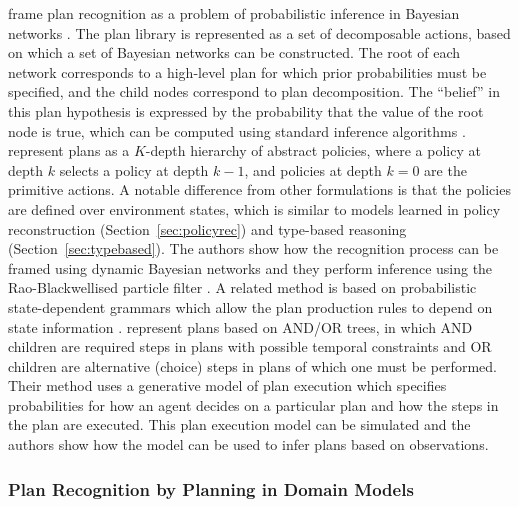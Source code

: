 \documentclass[final,1p,times,authoryear]{elsarticle}
\begin{document}
\citet{cg1993} frame plan recognition as a problem of probabilistic inference in Bayesian networks \citep{p1988}. The plan library is represented as a set of decomposable actions, based on which a set of Bayesian networks can be constructed. The root of each network corresponds to a high-level plan for which prior probabilities must be specified, and the child nodes correspond to plan decomposition. The ``belief'' in this plan hypothesis is expressed by the probability that the value of the root node is true, which can be computed using standard inference algorithms \citep{p1988}. \citet{bvw2002} represent plans as a $K$-depth hierarchy of abstract policies, where a policy at depth $k$ selects a policy at depth $k-1$, and policies at depth $k=0$ are the primitive actions. A notable difference from other formulations is that the policies are defined over environment states, which is similar to models learned in policy reconstruction (Section~\ref{sec:policyrec}) and type-based reasoning (Section~\ref{sec:typebased}). The authors show how the recognition process can be framed using dynamic Bayesian networks and they perform inference using the Rao-Blackwellised particle filter \citep{dfmr2000}. A related method is based on probabilistic state-dependent grammars which allow the plan production rules to depend on state information \citep{pw2000}. \citet{gg2009} represent plans based on AND/OR trees, in which AND children are required steps in plans with possible temporal constraints and OR children are alternative (choice) steps in plans of which one must be performed. Their method uses a generative model of plan execution which specifies probabilities for how an agent decides on a particular plan and how the steps in the plan are executed. This plan execution model can be simulated and the authors show how the model can be used to infer plans based on observations.


			\subsubsection{Plan Recognition by Planning in Domain Models} \label{sec:planrec-planning}
\end{document}
